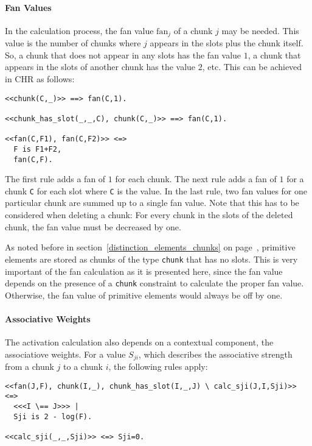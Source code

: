 \paragraph{Fan Values}

In the calculation process, the fan value $\mathrm{fan}_j$ of a chunk $j$ may be needed. This value is the number of chunks where $j$ appears in the slots plus the chunk itself. So, a chunk that does not appear in any slots has the fan value $1$, a chunk that appears in the slots of another chunk has the value $2$, etc. This can be achieved in CHR as follows:

\begin{lstlisting}
<<chunk(C,_)>> ==> fan(C,1).

<<chunk_has_slot(_,_,C), chunk(C,_)>> ==> fan(C,1).

<<fan(C,F1), fan(C,F2)>> <=> 
  F is F1+F2, 
  fan(C,F).
\end{lstlisting}

The first rule adds a fan of $1$ for each chunk. The next rule adds a fan of $1$ for a chunk \lstinline|C| for each slot where \lstinline|C| is the value. In the last rule, two fan values for one particular chunk are summed up to a single fan value. Note that this has to be considered when deleting a chunk: For every chunk in the slots of the deleted chunk, the fan value must be decreased by one.

As noted before in section~\ref{distinction_elements_chunks} on page~\pageref{distinction_elements_chunks}, primitive elements are stored as chunks of the type \lstinline|chunk| that has no slots. This is very important of the fan calculation as it is presented here, since the fan value depends on the presence of a \lstinline|chunk| constraint to calculate the proper fan value. Otherwise, the fan value of primitive elements would always be off by one.

\paragraph{Associative Weights}

The activation calculation also depends on a contextual component, the associatiove weights. For a value $S_{ji}$, which describes the associative strength from a chunk $j$ to a chunk $i$, the following rules apply:

\begin{lstlisting}
<<fan(J,F), chunk(I,_), chunk_has_slot(I,_,J) \ calc_sji(J,I,Sji)>> <=> 
  <<<I \== J>>> | 
  Sji is 2 - log(F).

<<calc_sji(_,_,Sji)>> <=> Sji=0.
\end{lstlisting}

